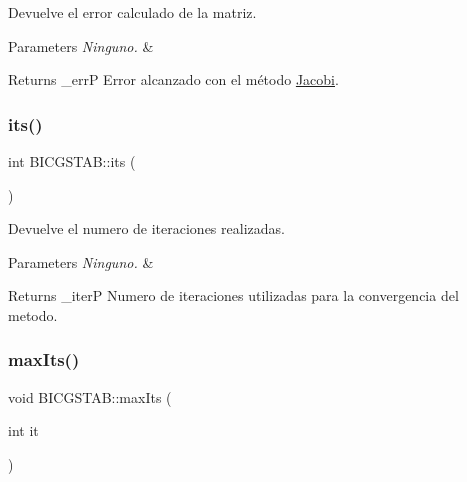 Devuelve el error calculado de la matriz. 


\begin{DoxyParams}{Parameters}
{\em Ninguno.} & \\
\hline
\end{DoxyParams}
\begin{DoxyReturn}{Returns}
\+\_\+errP Error alcanzado con el método \hyperlink{class_jacobi}{Jacobi}. 
\end{DoxyReturn}
\hypertarget{class_b_i_c_g_s_t_a_b_aecce9b8f005c466d331c57abf249a11a}{}\label{class_b_i_c_g_s_t_a_b_aecce9b8f005c466d331c57abf249a11a} 
\subsubsection{\texorpdfstring{its()}{its()}}
{\footnotesize\ttfamily int B\+I\+C\+G\+S\+T\+A\+B\+::its (\begin{DoxyParamCaption}{ }\end{DoxyParamCaption})\hspace{0.3cm}{\ttfamily [inline]}}



Devuelve el numero de iteraciones realizadas. 


\begin{DoxyParams}{Parameters}
{\em Ninguno.} & \\
\hline
\end{DoxyParams}
\begin{DoxyReturn}{Returns}
\+\_\+iterP Numero de iteraciones utilizadas para la convergencia del metodo. 
\end{DoxyReturn}
\hypertarget{class_b_i_c_g_s_t_a_b_a4fbacde944b86eb6fb24b1ea6f45d5c1}{}\label{class_b_i_c_g_s_t_a_b_a4fbacde944b86eb6fb24b1ea6f45d5c1} 
\subsubsection{\texorpdfstring{max\+Its()}{maxIts()}}
{\footnotesize\ttfamily void B\+I\+C\+G\+S\+T\+A\+B\+::max\+Its (\begin{DoxyParamCaption}\item[{int}]{it }\end{DoxyParamCaption})\hspace{0.3cm}{\ttfamily [inline]}}



